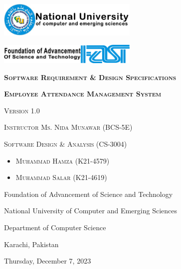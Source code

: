 \documentclass[a4paper, 12pt]{article}
\begin{document}
\begin{titlepage}
    \centering
    \vspace{3.5cm}
    \includegraphics[width=0.5\textwidth]{NU-logo.jpg}\par\vspace{1cm}
    \includegraphics[width=0.5\textwidth]{FAST.png}\par\vspace{1cm}
    \vspace{2cm}
    {\scshape\Large\textbf {Software Requirement \& Design Specifications} \par}
    \vspace{2cm}
    {\scshape\LARGE\textbf {Employee Attendance Management System} \par}
    \vspace{0.25cm}
    {\scshape\Large Version 1.0 \par}
    \vspace{2cm}
    {\scshape\Large Instructor Ms. Nida Munawar (BCS-5E) \par}
    \vspace{0.25cm}
    {\scshape\Large Software Design \& Analysis (CS-3004) \par}
    \vspace{2cm}
    \begin{itemize}
    \item {\scshape\Large Muhammad Hamza (K21-4579) \par}
    \vspace{0.25cm}
    \item {\scshape\Large Muhammad Salar (K21-4619) \par}
    \end{itemize}
    \vfill
    \vspace{1cm}    
    {Foundation of Advancement of Science and Technology \par}
    {National University of Computer and Emerging Sciences \par}
    {Department of Computer Science \par}
    {Karachi, Pakistan \par}
    {Thursday, December 7, 2023 \par}
\end{titlepage}
\end{document}

